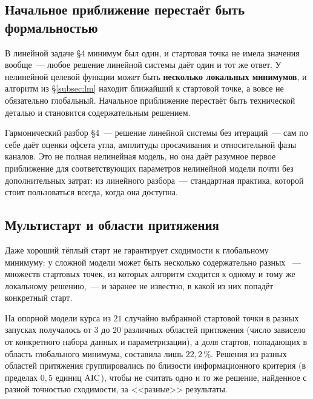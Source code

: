 \subsection{Начальное приближение перестаёт быть формальностью}
\label{subsec:init}

В линейной задаче §4 минимум был один, и стартовая точка не имела значения вообще~--- любое
решение линейной системы даёт один и тот же ответ. У нелинейной целевой функции может быть
\textbf{несколько локальных минимумов}, и алгоритм из §\ref{subsec:lm} находит ближайший к
стартовой точке, а вовсе не обязательно глобальный. Начальное приближение перестаёт быть
технической деталью и становится содержательным решением.

\begin{intuition}
Гармонический разбор §4~--- решение линейной системы без итераций~--- сам по себе даёт оценки
офсета угла, амплитуды просачивания и относительной фазы каналов. Это не полная нелинейная
модель, но она даёт разумное первое приближение для соответствующих параметров нелинейной модели
почти без дополнительных затрат:  из линейного разбора~--- стандартная практика,
которой стоит пользоваться всегда, когда она доступна.
\end{intuition}

\subsection{Мультистарт и области притяжения}
\label{subsec:multistart}

\begin{warning}
Даже хороший тёплый старт не гарантирует сходимости к глобальному минимуму: у сложной модели
может быть несколько содержательно разных ~--- множеств стартовых точек,
из которых алгоритм сходится к одному и тому же локальному решению,~--- и заранее не известно,
в какой из них попадёт конкретный старт.
\end{warning}

\begin{example}
На опорной модели курса из $21$ случайно выбранной стартовой точки в разных запусках получалось
от $3$ до $20$ различных областей притяжения (число зависело от конкретного набора данных и
параметризации), а доля стартов, попадающих в область глобального минимума, составила лишь
\textbf{$22{,}2\,\%$}. Решения из разных областей притяжения группировались по близости
информационного критерия (в пределах $0{,}5$ единиц $\operatorname{AIC}$), чтобы не считать одно и то же
решение, найденное с разной точностью сходимости, за <<разные>> результаты.
\end{example}

